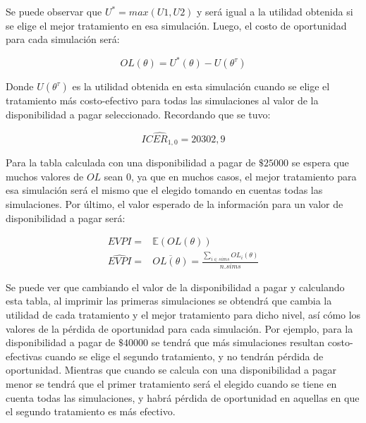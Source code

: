 \documentclass[12pt]{article}
\begin{document}
Se puede observar que $U^* = max(U1,U2)$ y será igual a la utilidad obtenida si se elige el mejor tratamiento en esa simulación.
Luego, el costo de oportunidad para cada simulación será:

\begin{equation}
        OL(\theta) = U^{*}(\theta)-U(\theta^\tau)
\end{equation}

Donde $U(\theta^\tau)$ es la utilidad obtenida en esta simulación cuando se elige el tratamiento más costo-efectivo para todas las simulaciones al valor de la disponibilidad a pagar seleccionado. Recordando que se tuvo:

$$
\widehat{ICER_{1,0}} = 20302,9
$$

Para la tabla calculada con una disponibilidad a pagar de $\$25000$ se espera que muchos valores de $OL$ sean $0$, ya que en muchos casos, el mejor tratamiento para esa simulación será el mismo que el elegido tomando en cuentas todas las simulaciones. Por último, el valor esperado de la información para un valor de disponibilidad a pagar será:

\begin{equation}
\begin{split}
EVPI =  & \mathbb{E}(OL(\theta)) \\
\widehat{EVPI} = & \overline{OL(\theta)} = \frac{\sum_{i \in sims} OL_i (\theta)}{n.sims}
\end{split}
\label{eq:evpi}
\end{equation}

Se puede ver que cambiando el valor de la disponibilidad a pagar y calculando esta tabla, al imprimir las primeras simulaciones se obtendrá que cambia la utilidad de cada tratamiento y el mejor tratamiento para dicho nivel, así cómo los valores de la pérdida de oportunidad para cada simulación. Por ejemplo, para la disponibilidad a pagar de $\$40000$ se tendrá que más simulaciones resultan costo-efectivas cuando se elige el segundo tratamiento, y no tendrán pérdida de oportunidad. Mientras que cuando se calcula con una disponibilidad a pagar menor se tendrá que el primer tratamiento será el elegido cuando se tiene en cuenta todas las simulaciones, y habrá pérdida de oportunidad en aquellas en que el segundo tratamiento es más efectivo.
\end{document}
